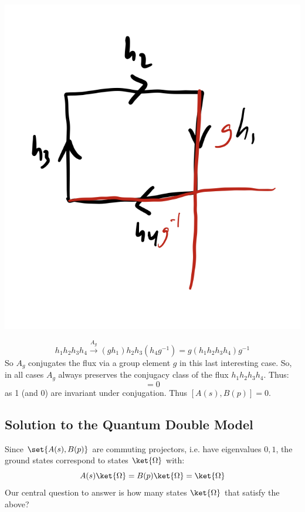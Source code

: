 \begin{enumerate}
    \begin{center}
        \includegraphics[scale=0.35]{Lectures/Images/lec7-overlap3.png}
    \end{center}

    \begin{equation}
        h_1h_2h_3h_4 \stackrel{A_g}{\to} (gh_1)h_2h_3(h_4g^{-1}) = g(h_1h_2h_3h_4)g^{-1}
    \end{equation}
    So $A_g$ conjugates the flux via a group element $g$ in this last interesting case. So, in all cases $A_g$ always preserves the conjugacy class of the flux $h_1h_2h_3h_4$. Thus:
    \begin{equation}
        [A_g(s), B(p)] = 0
    \end{equation}
    as 1 (and 0) are invariant under conjugation. Thus $[A(s), B(p)] = 0$.
\end{enumerate}

\subsection{Solution to the Quantum Double Model}
Since $\set{A(s), B(p)}$ are commuting projectors, i.e. have eigenvalues $0,1$, the ground states correspond to states $\ket{\Omega}$ with:
\begin{equation}
    A(s)\ket{\Omega} = B(p)\ket{\Omega} = \ket{\Omega}
\end{equation}
Our central question to answer is how many states $\ket{\Omega}$ that satisfy the above?

